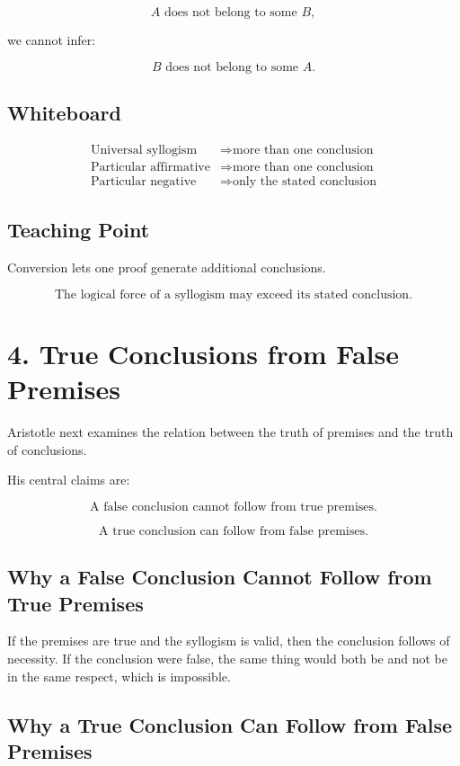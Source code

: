 \documentclass[12pt]{article}
\begin{document}
\[
A \text{ does not belong to some } B,
\]

we cannot infer:

\[
B \text{ does not belong to some } A.
\]

\subsection*{Whiteboard}

\[
\begin{array}{ll}
\text{Universal syllogism} & \Rightarrow \text{more than one conclusion} \\
\text{Particular affirmative} & \Rightarrow \text{more than one conclusion} \\
\text{Particular negative} & \Rightarrow \text{only the stated conclusion}
\end{array}
\]

\subsection*{Teaching Point}

Conversion lets one proof generate additional conclusions.

\[
\boxed{
\text{The logical force of a syllogism may exceed its stated conclusion.}
}
\]

\section*{4. True Conclusions from False Premises}

Aristotle next examines the relation between the truth of premises and the truth
of conclusions.

His central claims are:

\[
\boxed{
\text{A false conclusion cannot follow from true premises.}
}
\]

\[
\boxed{
\text{A true conclusion can follow from false premises.}
}
\]

\subsection*{Why a False Conclusion Cannot Follow from True Premises}

If the premises are true and the syllogism is valid, then the conclusion follows
of necessity. If the conclusion were false, the same thing would both be and not
be in the same respect, which is impossible.

\subsection*{Why a True Conclusion Can Follow from False Premises}
\end{document}
